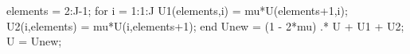     elements = 2:J-1;  
    for i = 1:1:J
        U1(elements,i) = mu*U(elements+1,i); 
        U2(i,elements) = mu*U(i,elements+1);
    end
    Unew = (1 - 2*mu) .* U + U1 + U2;
    U = Unew;
